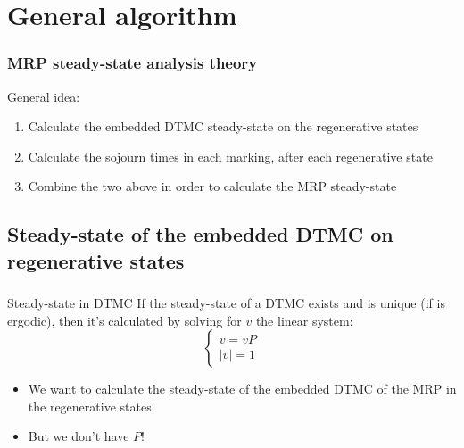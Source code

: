 \section{General algorithm}
\begin{frame}
  \frametitle{\acf{MRP} steady-state analysis theory}
  General idea:
  \begin{enumerate}
  \item<2-> Calculate the embedded \acs{DTMC} steady-state on the
    regenerative states
  \item<3-> Calculate the sojourn times in each marking, after each
    regenerative state
  \item<4-> Combine the two above in order to calculate the \acs{MRP} steady-state
  \end{enumerate}
  \begin{center}
  \end{center}
\end{frame}

\subsection{Steady-state of the embedded \acs{DTMC} on regenerative
  states}
\begin{frame}
  \frametitle{\insertsubsection}
  \begin{block}{Steady-state in \acf{DTMC}}
    If the steady-state of a \acf{DTMC} exists and is unique (if is
    ergodic), then it's calculated by solving for $v$ the linear
    system:
    \begin{equation*}
      \begin{cases}
        v=vP\\
        |v| = 1
      \end{cases}
    \end{equation*}
  \end{block}
  \pause
  \begin{itemize}
  \item We want to calculate the steady-state of the embedded \acs{DTMC} of the \acs{MRP} in
    the regenerative states
    \pause
  \item But we don't have $P$! \pause {}
  \end{itemize}
\end{frame}

